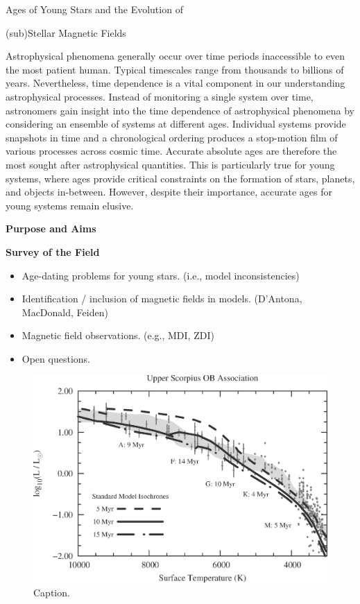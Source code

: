 \documentclass[12pt,a4paper]{article}
\begin{document}
\begin{center}
	{\bf {\LARGE Ages of Young Stars and the Evolution of 
	
	(sub)Stellar Magnetic Fields}} 
\end{center}

Astrophysical phenomena generally occur over time periods inaccessible to even the most patient human. Typical timescales range from thousands to billions of years. Nevertheless, time dependence is a vital component in our understanding astrophysical processes. 
Instead of monitoring a single system over time, astronomers gain insight into the time dependence of astrophysical phenomena by considering an ensemble of systems at different ages. Individual systems provide snapshots in time and a chronological ordering produces a stop-motion film of various processes across cosmic time. Accurate absolute ages are therefore the most sought after astrophysical quantities. This is particularly true for young systems, where ages provide critical constraints on the formation of stars, planets, and objects in-between. However, despite their importance, accurate ages for young systems remain elusive.

\vspace{\baselineskip}

{\bf \large Purpose and Aims}

\clearpage

{\bf \large Survey of the Field}
\begin{itemize}
	\item Age-dating problems for young stars. (i.e., model inconsistencies)
	\item Identification / inclusion of magnetic fields in models. (D'Antona, MacDonald, Feiden)
	\item Magnetic field observations. (e.g., MDI, ZDI)
	\item Open questions.
\end{itemize}

\begin{figure}
	\centering
	\includegraphics[width=0.75\linewidth]{./fig/USco_Age_Problems.eps}
	\caption{Caption.}
	\label{fig:probs}
\end{figure}
\end{document}
